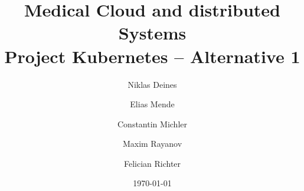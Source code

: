 \documentclass[a4paper, 12pt, twoside]{report}
\title{Medical Cloud and distributed Systems \\ Project Kubernetes – Alternative 1}
\author{Niklas Deines \and Elias Mende \and Constantin Michler \and Maxim Rayanov \and Felician Richter}
\date{\today}
\begin{document}
    \nonfrenchspacing
    \maketitle

    \renewcommand\contentsname{Table of Contents}
    \tableofcontents

    
    
    
\end{document}
